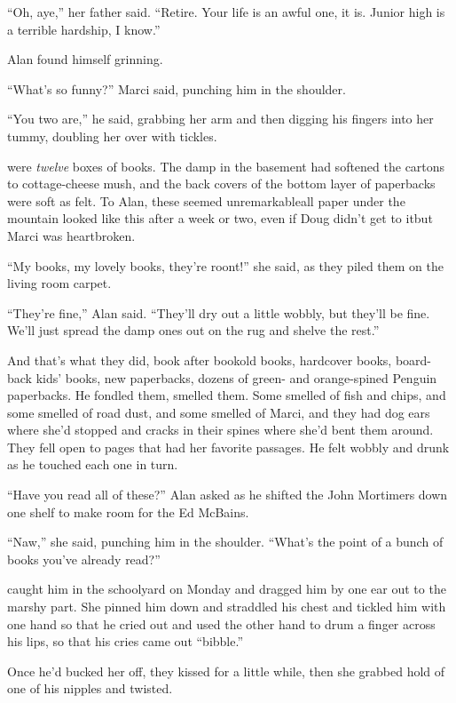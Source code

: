 ``Oh, aye,'' her father said.  ``Retire.  Your life is an awful one,
it is.  Junior high is a terrible hardship, I know.''

Alan found himself grinning.

``What's so funny?'' Marci said, punching him in the shoulder.

``You two are,'' he said, grabbing her arm and then digging his
fingers into her tummy, doubling her over with tickles.

 were \textit{twelve} boxes of books.  The damp in the basement
had softened the cartons to cottage-cheese mush, and the back covers
of the bottom layer of paperbacks were soft as felt.  To Alan, these
seemed unremarkable\dash{}all paper under the mountain looked like this
after a week or two, even if Doug didn't get to it\dash{}but Marci was
heartbroken.

``My books, my lovely books, they're roont!'' she said, as they piled
them on the living room carpet.

``They're fine,'' Alan said.  ``They'll dry out a little wobbly, but
they'll be fine.  We'll just spread the damp ones out on the rug and
shelve the rest.''

And that's what they did, book after book\dash{}old books, hardcover
books, board-back kids' books, new paperbacks, dozens of green- and
orange-spined Penguin paperbacks.  He fondled them, smelled them. 
Some smelled of fish and chips, and some smelled of road dust, and
some smelled of Marci, and they had dog ears where she'd stopped and
cracks in their spines where she'd bent them around.  They fell open
to pages that had her favorite passages.  He felt wobbly and drunk as
he touched each one in turn.

``Have you read all of these?'' Alan asked as he shifted the John
Mortimers down one shelf to make room for the Ed McBains.

``Naw,'' she said, punching him in the shoulder.  ``What's the point
of a bunch of books you've already read?''

 caught him in the schoolyard on Monday and dragged him by one ear
out to the marshy part.  She pinned him down and straddled his chest
and tickled him with one hand so that he cried out and used the other
hand to drum a finger across his lips, so that his cries came out
``bibble.''

Once he'd bucked her off, they kissed for a little while, then she
grabbed hold of one of his nipples and twisted.

